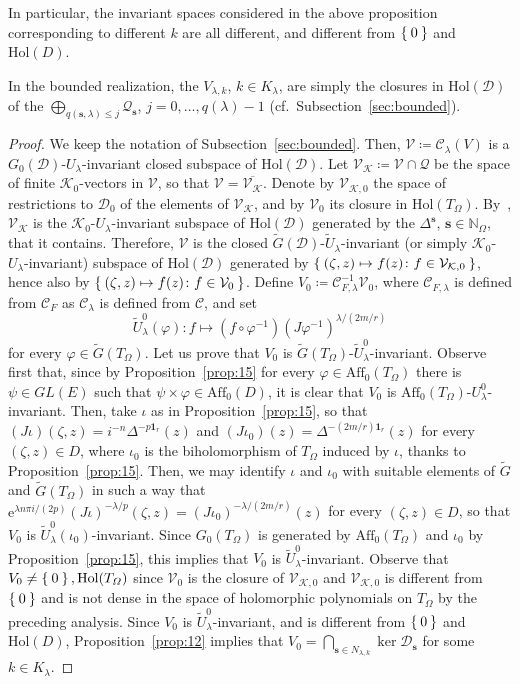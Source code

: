 \documentclass[10.5pt,reqno]{amsart}
\newcommand{\Aff}{\mathrm{Aff}}
\newcommand{\Hol}{\mathrm{Hol}}
\newcommand{\ee}{\mathrm{e}}
\newcommand{\vect}[1]{\mathbf{{#1}}}
\newcommand{\N}{\mathds{N}}
\newcommand{\Cc}{\mathcal{C}}
\newcommand{\Dc}{\mathcal{D}}
\newcommand{\Kc}{\mathcal{K}}
\newcommand{\Qc}{\mathcal{Q}}
\newcommand{\Vc}{\mathcal{V}}
\newcommand{\meg}{\leqslant}
\renewcommand{\phi}{\varphi}
\begin{document}
In particular, the invariant spaces considered in the above proposition corresponding to different $k$ are all different, and different from $\Set{0}$ and $\Hol(D)$.

In the bounded realization, the $V_{\lambda,k}$, $k\in K_\lambda$, are simply the closures in $\Hol(\Dc)$ of the $\bigoplus_{q(\vect s,\lambda)\meg j} \Qc_{\vect s}$, $j=0,\dots, q(\lambda)-1$ (cf.~Subsection~\ref{sec:bounded}).

\begin{proof}
	We keep the notation of Subsection~\ref{sec:bounded}. Then, $\Vc\coloneqq \Cc_\lambda(V)$ is a $G_0(\Dc)$-$U_\lambda$-invariant closed subspace of $\Hol(\Dc)$. Let $\Vc_\Kc\coloneqq \Vc\cap \Qc$ be the space of finite $\Kc_0$-vectors in $\Vc$, so that $\Vc=\overline{\Vc_\Kc}$.
	Denote by $\Vc_{\Kc,0}$ the space of restrictions to $\Dc_0$ of the elements of  $\Vc_\Kc$, and by $\Vc_0$ its closure in $\Hol(T_\Omega)$. By~\cite[Theorem 2.1]{FarautKoranyi2}, 	$\Vc_\Kc$ is the  $\Kc_0$-$U_\lambda$-invariant subspace of  $\Hol(\Dc)$ generated by the $\Delta^{\vect s}$, $\vect s\in \N_\Omega $, that it contains. Therefore,	
	$\Vc$ is the closed $\widetilde G(\Dc)$-$\widetilde U_\lambda$-invariant (or simply $\Kc_0$-$U_\lambda$-invariant) subspace of  $\Hol(\Dc)$ generated by $\Set{(\zeta,z)\mapsto f(z)\colon f\in \Vc_{\Kc,0}}$, hence also by $\Set{(\zeta,z)\mapsto f(z)\colon f\in \Vc_{0}}$. 
	Define $V_0\coloneqq \Cc_{F,\lambda}^{-1}\Vc_0$, where $\Cc_{F,\lambda}$ is defined from $\Cc_F$ as $\Cc_\lambda$ is defined from $\Cc$, and set
	\[
	\widetilde U_\lambda^0(\phi)\colon f \mapsto (f\circ \phi^{-1}) (J \phi^{-1})^{\lambda/(2 m/r)}
	\]
	for every $\phi \in \widetilde G(T_\Omega)$. Let us prove that $V_0 $ is $\widetilde G(T_\Omega)$-$\widetilde U_\lambda^0$-invariant. 
	Observe first that, since by Proposition~\ref{prop:15} for every $\phi \in \Aff_0(T_\Omega)$ there is $\psi\in GL(E)$ such that $\psi\times \phi\in \Aff_0(D)$, it is clear that $V_0$ is $\Aff_0(T_\Omega)$-$U_\lambda^0$-invariant. 
	Then, take $\iota$ as in Proposition~\ref{prop:15}, so that $(J\iota)(\zeta,z)=i^{-n}\Delta^{-p\vect 1_r}(z)$ and $(J\iota_0)(z)=\Delta^{-(2m/r)\vect 1_r}(z)$ for every $(\zeta,z)\in D$, where $\iota_0$ is the biholomorphism of $T_\Omega$ induced by $\iota$, thanks to Proposition~\ref{prop:15}. 
	Then, we may identify $\iota$ and $\iota_0$ with suitable elements of $\widetilde G$ and $\widetilde G(T_\Omega)$ in such a way that $\ee^{\lambda n \pi i/(2 p) }(J\iota)^{-\lambda/p}(\zeta,z)=(J\iota_0)^{-\lambda/(2 m/r)}(z)$ for every $(\zeta,z)\in D$, so that $V_0$ is $\widetilde U^0_\lambda(\iota_0)$-invariant. 
	Since $G_0(T_\Omega)$ is generated by $\Aff_0(T_\Omega)$ and $\iota_0$ by Proposition~\ref{prop:15}, this implies that $V_0$ is $\widetilde U^0_\lambda$-invariant. 
	Observe that $V_0\neq \Set{0}, \Hol(T_\Omega)$ since $\Vc_0$ is the closure of $\Vc_{\Kc,0}$ and $\Vc_{\Kc,0}$ is different from $\Set{0}$ and is not dense in the space of holomorphic polynomials on $T_\Omega$ by the preceding analysis. 
	Since $V_0$ is $\widetilde U^0_\lambda$-invariant, and is different from $\Set{0}$ and $\Hol(D)$, Proposition~\ref{prop:12} implies that $V_0=\bigcap_{\vect s\in N_{\lambda,k}}\ker \Dc_{\vect s}$ for some $k\in K_\lambda$. 
	

\end{proof}
\end{document}
